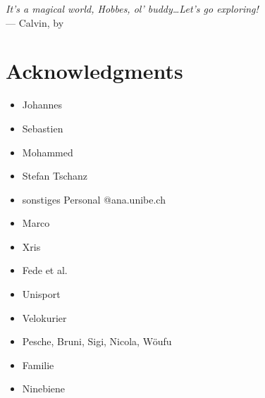 
\begin{flushright}{\slshape    
		It's a magical world, Hobbes, ol' buddy\dots Let's go exploring!} \\ \medskip
    --- Calvin, by \citep{Watterson1996}
\end{flushright}

\bigskip
\begingroup
\let\clearpage\relax
\let\cleardoublepage\relax
\let\cleardoublepage\relax
\chapter*{Acknowledgments}
\begin{itemize}
	\item Johannes
	\item Sebastien
	\item Mohammed
	\item Stefan Tschanz
	\item sonstiges Personal @ana.unibe.ch
\end{itemize}
\bigskip
\begin{itemize}
	\item Marco
	\item Xris
	\item Fede et al.
\end{itemize}
\bigskip
\begin{itemize}
	\item Unisport
	\item Velokurier
\end{itemize}
\bigskip
\begin{itemize}
	\item Pesche, Bruni, Sigi, Nicola, Wöufu
	\item Familie
	\item Ninebiene
\end{itemize}

\endgroup